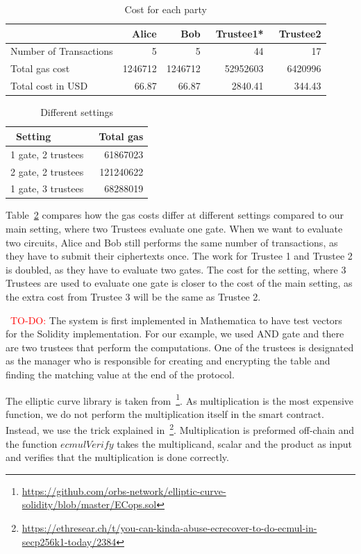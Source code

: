 \begin{table}[!h]
		\centering
	\begin{tabular}{|l|r|r|r|r|}
		\hline
		& ~\textbf{Alice} &  ~\textbf{Bob} & ~\textbf{Trustee1*}  & ~\textbf{Trustee2}  \\ \hline
		Number of Transactions	& 5 &5  &44  &17  \\ \hline
		Total gas cost	& 1246712 &  1246712& 52952603  & 6420996 \\ \hline
		Total cost in USD	&  66.87& 66.87 &2840.41  & 344.43 \\ \hline
	\end{tabular}
	\caption{Cost for each party} 
	\label{tab:participantcost}
\end{table}



\begin{table}[!h]
		\centering
	\begin{tabular}{|l|r|}
	\hline
	~\textbf{Setting}	& ~\textbf{Total gas}  \\ \hline
	1 gate, 2 trustees	& 61867023  \\ \hline
	2 gate, 2 trustees	&  121240622 \\ \hline
	1 gate, 3 trustees	& 68288019 \\ \hline
\end{tabular}
	\caption{Different settings}
	\label{tab:settings}
\end{table}

Table~\ref{tab:settings} compares how the gas costs differ at different settings compared to our main setting, where two Trustees evaluate one gate. When we want to evaluate two circuits, Alice and Bob still performs the same number of transactions, as they have to submit their ciphertexts once. The work for Trustee 1 and Trustee 2 is doubled, as they have to evaluate two gates. The cost for the setting, where 3 Trustees are used to evaluate one gate is closer to the cost of the main setting, as the extra cost from Trustee 3 will be the same as Trustee 2.

~\textcolor{red}{TO-DO:}
The system is first implemented in Mathematica to have test vectors for the Solidity implementation. For our example, we used AND gate and there are two trustees that perform the computations. One of the trustees is designated as the manager who is responsible for creating and encrypting the table and finding the matching value at the end of the protocol.

The elliptic curve library is taken from~\footnote{\url{https://github.com/orbs-network/elliptic-curve-solidity/blob/master/ECops.sol}}. As multiplication is the most expensive function, we do not perform the multiplication itself in the smart contract. Instead, we use the trick explained in~\footnote{\url{https://ethresear.ch/t/you-can-kinda-abuse-ecrecover-to-do-ecmul-in-secp256k1-today/2384}}. Multiplication is preformed off-chain and the function $ecmulVerify$ takes the multiplicand, scalar and the product as input and verifies that the multiplication is done correctly.

